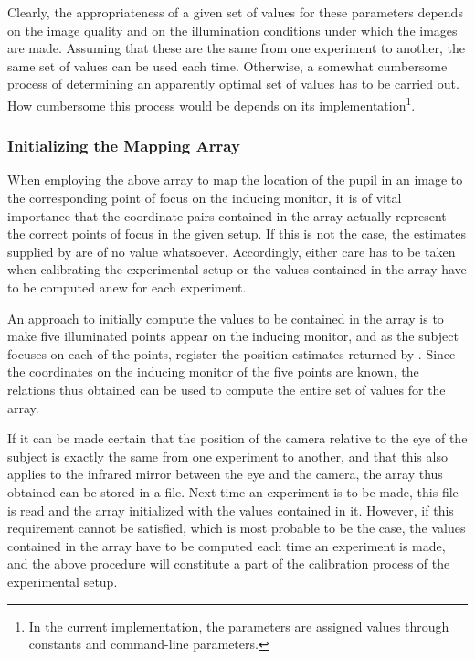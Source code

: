 Clearly, the appropriateness of a given set of values for these
parameters depends on the image quality and on the illumination
conditions under which the images are made.  Assuming that these are
the same from one experiment to another, the same set of values can be
used each time.  Otherwise, a somewhat cumbersome process of
determining an apparently optimal set of values has to be carried out.
How cumbersome this process would be depends on its
implementation\footnote{In the current implementation, the parameters
  are assigned values through constants and command-line parameters.}.

\subsubsection{Initializing the Mapping Array}

When employing the above array to map the location of the pupil in an
image to the corresponding point of focus on the inducing monitor, it
is of vital importance that the coordinate pairs contained in the
array actually represent the correct points of focus in the given
setup.  If this is not the case, the estimates supplied by {\octopus}
are of no value whatsoever.  Accordingly, either care has to be taken
when calibrating the experimental setup or the values contained in
the array have to be computed anew for each experiment.

An approach to initially compute the values to be contained in the
array is to make five illuminated points appear on the inducing
monitor, and as the subject focuses on each of the points, register
the position estimates returned by {\octopus}.  Since the coordinates
on the inducing monitor of the five points are known, the relations
thus obtained can be used to compute the entire set of values for the
array.

If it can be made certain that the position of the camera relative to
the eye of the subject is exactly the same from one experiment to
another, and that this also applies to the infrared mirror between the
eye and the camera, the array thus obtained can be stored in a file.
Next time an experiment is to be made, this file is read and the array
initialized with the values contained in it.  However, if this
requirement cannot be satisfied, which is most probable to be the
case, the values contained in the array have to be computed each time
an experiment is made, and the above procedure will constitute a part
of the calibration process of the experimental setup.

